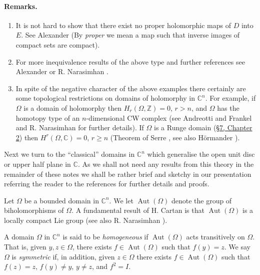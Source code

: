 \paragraph*{Remarks.}
\begin{enumerate}
\item It is not hard to show that there exist no proper holomorphic maps of $D$ into $E$. See Alexander \cite{bib:I:alexander-h:1} (By \emph{proper} we mean a map such that inverse images of compact sets are compact).
\item For more inequivalence results of the above type and further references see Alexander \cite{bib:I:alexander-h:1} or R. Narasimhan \cite[Chapter 5]{bib:I:narasimhan-r:2}.
\item In spite of the negative character of the above examples there certainly are some topological restrictions on domains of holomorphy in $\mathbb C^n$. For example, if $\Omega$ is a domain of holomorphy then $H_r(\Omega,\mathbb Z)=0$, $r>n$, and $\Omega$ has the homotopy type of an $n$-dimensional CW complex (see Andreotti and Frankel \cite{bib:I:andreotti-a-and-frankel-t:1} and R. Narasimhan \cite{bib:I:narasimhan-r:4,bib:I:narasimhan-r:5} for further details). If $\Omega$ is a Runge domain (\hyperref[sec:2:7]{\S7, Chapter 2}) then $H^r(\Omega,\mathbb C)=0$, $r\geq n$ (Theorem of Serre \cite{bib:I:serre-j-p:1}, see also H\"ormander \cite[Theorem 2.7.11]{bib:I:hormander-l:1}).
\end{enumerate}

Next we turn to the ``classical'' domains in $\mathbb C^n$ which generalise the open unit disc or upper half plane in $\mathbb C$. As we shall not need any results from this theory in the remainder of these notes we shall be rather brief and sketchy in our presentation referring the reader to the references for further details and proofs.

Let $\Omega$ be a bounded domain in $\mathbb C^n$. We let $\operatorname{Aut}(\Omega)$ denote the group of biholomorphisms of $\Omega$. A fundamental result of H. Cartan \cite{bib:I:cartan-h:4} is that $\operatorname{Aut}(\Omega)$ is a locally compact Lie group (see also R. Narasimhan \cite{bib:I:narasimhan-r:2}).

 A domain $\Omega$ in $\mathbb C^n$ is said to be \emph{homogeneous} if $\operatorname{Aut}(\Omega)$ acts transitively on $\Omega$. That is, given $y,z\in\Omega$, there exists $f\in\operatorname{Aut}(\Omega)$ such that $f(y)=z$. We say $\Omega$ is \emph{symmetric} if, in addition, given $z\in\Omega$ there exists $f\in\operatorname{Aut}(\Omega)$ such that $f(z)=z$, $f(y)\neq y$, $y\neq z$, and $f^2=I$.


